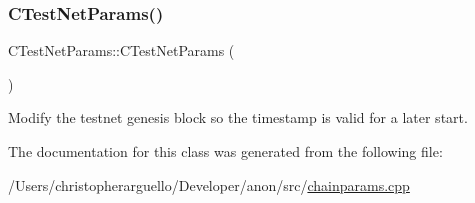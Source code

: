 \subsubsection{\texorpdfstring{C\+Test\+Net\+Params()}{CTestNetParams()}}
{\footnotesize\ttfamily C\+Test\+Net\+Params\+::\+C\+Test\+Net\+Params (\begin{DoxyParamCaption}{ }\end{DoxyParamCaption})\hspace{0.3cm}{\ttfamily [inline]}}

Modify the testnet genesis block so the timestamp is valid for a later start. 

The documentation for this class was generated from the following file\+:\begin{DoxyCompactItemize}
\item 
/\+Users/christopherarguello/\+Developer/anon/src/\mbox{\hyperlink{chainparams_8cpp}{chainparams.\+cpp}}\end{DoxyCompactItemize}
